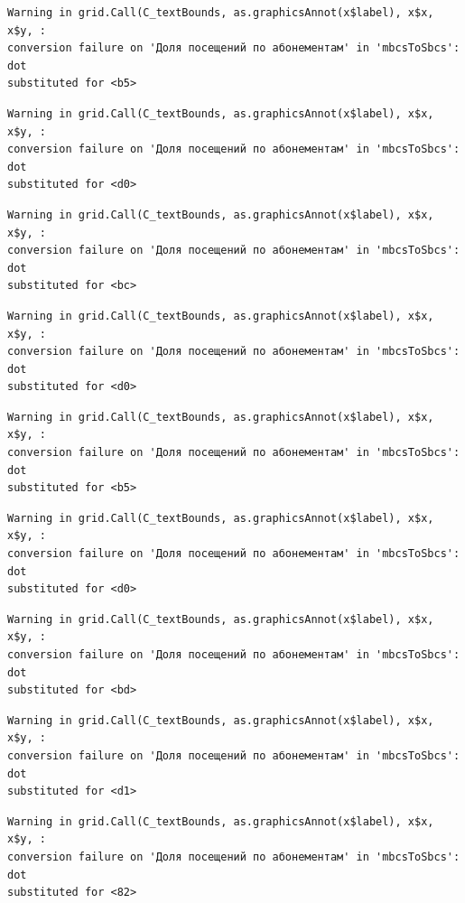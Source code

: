 \documentclass[
  letterpaper,
  DIV=11,
  numbers=noendperiod]{scrartcl}
\begin{document}
\begin{verbatim}
Warning in grid.Call(C_textBounds, as.graphicsAnnot(x$label), x$x, x$y, :
conversion failure on 'Доля посещений по абонементам' in 'mbcsToSbcs': dot
substituted for <b5>
\end{verbatim}

\begin{verbatim}
Warning in grid.Call(C_textBounds, as.graphicsAnnot(x$label), x$x, x$y, :
conversion failure on 'Доля посещений по абонементам' in 'mbcsToSbcs': dot
substituted for <d0>
\end{verbatim}

\begin{verbatim}
Warning in grid.Call(C_textBounds, as.graphicsAnnot(x$label), x$x, x$y, :
conversion failure on 'Доля посещений по абонементам' in 'mbcsToSbcs': dot
substituted for <bc>
\end{verbatim}

\begin{verbatim}
Warning in grid.Call(C_textBounds, as.graphicsAnnot(x$label), x$x, x$y, :
conversion failure on 'Доля посещений по абонементам' in 'mbcsToSbcs': dot
substituted for <d0>
\end{verbatim}

\begin{verbatim}
Warning in grid.Call(C_textBounds, as.graphicsAnnot(x$label), x$x, x$y, :
conversion failure on 'Доля посещений по абонементам' in 'mbcsToSbcs': dot
substituted for <b5>
\end{verbatim}

\begin{verbatim}
Warning in grid.Call(C_textBounds, as.graphicsAnnot(x$label), x$x, x$y, :
conversion failure on 'Доля посещений по абонементам' in 'mbcsToSbcs': dot
substituted for <d0>
\end{verbatim}

\begin{verbatim}
Warning in grid.Call(C_textBounds, as.graphicsAnnot(x$label), x$x, x$y, :
conversion failure on 'Доля посещений по абонементам' in 'mbcsToSbcs': dot
substituted for <bd>
\end{verbatim}

\begin{verbatim}
Warning in grid.Call(C_textBounds, as.graphicsAnnot(x$label), x$x, x$y, :
conversion failure on 'Доля посещений по абонементам' in 'mbcsToSbcs': dot
substituted for <d1>
\end{verbatim}

\begin{verbatim}
Warning in grid.Call(C_textBounds, as.graphicsAnnot(x$label), x$x, x$y, :
conversion failure on 'Доля посещений по абонементам' in 'mbcsToSbcs': dot
substituted for <82>
\end{verbatim}
\end{document}

